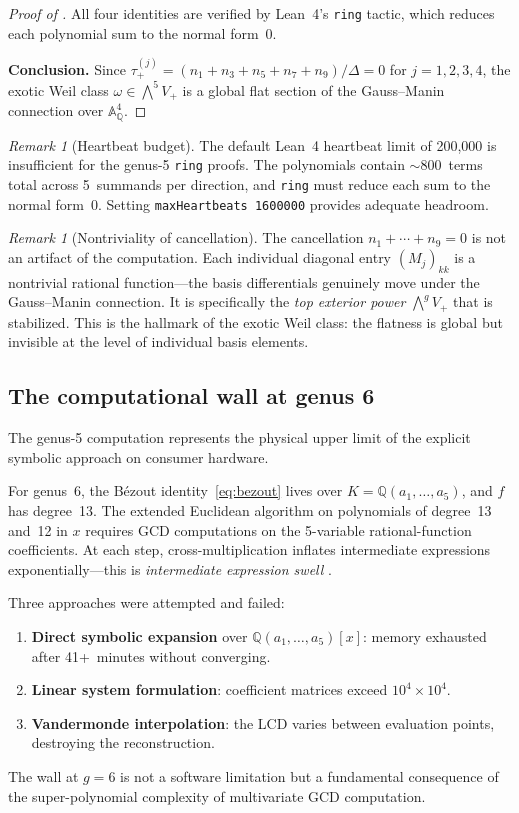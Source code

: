 \documentclass[11pt]{article}
\theoremstyle{plain}
\theoremstyle{definition}
\theoremstyle{remark}
\newtheorem{remark}[theorem]{Remark}
\newcommand{\QQ}{\mathbb{Q}}
\newcommand{\Aff}{\mathbb{A}}
\begin{document}
\begin{proof}[Proof of ]
All four identities are verified by Lean~4's \texttt{ring} tactic, which
reduces each polynomial sum to the normal form~$0$.

\medskip\noindent\textbf{Conclusion.}
Since $\tau_+^{(j)} = (n_1 + n_3 + n_5 + n_7 + n_9)/\Delta = 0$ for
$j = 1,2,3,4$, the exotic Weil class $\omega \in \bigwedge^5 V_+$ is a
global flat section of the Gauss--Manin connection over $\Aff^4_\QQ$.
\end{proof}

\begin{remark}[Heartbeat budget]
The default Lean~4 heartbeat limit of 200{,}000 is insufficient for the
genus-5 \texttt{ring} proofs.  The polynomials contain $\sim$800~terms
total across 5~summands per direction, and \texttt{ring} must reduce each
sum to the normal form~$0$.  Setting \texttt{maxHeartbeats 1600000} provides
adequate headroom.
\end{remark}

\begin{remark}[Nontriviality of cancellation]
The cancellation $n_1 + \cdots + n_9 = 0$ is not an artifact of the
computation.  Each individual diagonal entry $(M_j)_{kk}$ is a nontrivial
rational function---the basis differentials genuinely move under the
Gauss--Manin connection.  It is specifically the \emph{top exterior power}
$\bigwedge^g V_+$ that is stabilized.  This is the hallmark of the exotic
Weil class: the flatness is global but invisible at the level of individual
basis elements.
\end{remark}

\subsection{The computational wall at genus 6}
\label{sec:wall}

The genus-5 computation represents the physical upper limit of the explicit
symbolic approach on consumer hardware.

For genus~6, the B\'ezout identity~\eqref{eq:bezout} lives over
$K = \QQ(a_1, \ldots, a_5)$, and $f$ has degree~13.  The extended Euclidean
algorithm on polynomials of degree~13 and~12 in $x$ requires GCD computations
on the 5-variable rational-function coefficients.  At each step,
cross-multiplication inflates intermediate expressions exponentially---this
is \emph{intermediate expression swell} \cite{vonzurgathen2013,geddes1992}.

Three approaches were attempted and failed:
\begin{enumerate}[nosep]
  \item \textbf{Direct symbolic expansion} over $\QQ(a_1,\ldots,a_5)[x]$:
    memory exhausted after 41+~minutes without converging.
  \item \textbf{Linear system formulation}: coefficient matrices exceed
    $10^4 \times 10^4$.
  \item \textbf{Vandermonde interpolation}: the LCD varies between
    evaluation points, destroying the reconstruction.
\end{enumerate}
The wall at $g = 6$ is not a software limitation but a fundamental
consequence of the super-polynomial complexity of multivariate GCD
computation.
\end{document}
